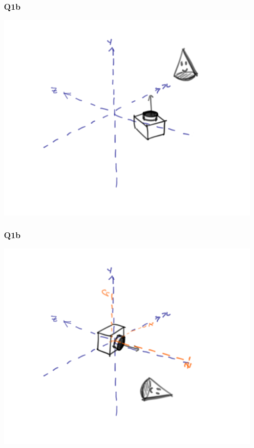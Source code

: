 \documentclass{beamer}
\begin{document}
\begin{frame}
    \frametitle{Q1b}

    \begin{center}
        \includegraphics[scale=1.3]{q1b-orig.png}
    \end{center}

\end{frame}

\begin{frame}
    \frametitle{Q1b}

    \begin{center}
        \includegraphics[scale=1.3]{q1b-align.png}
    \end{center}

\end{frame}
\end{document}
